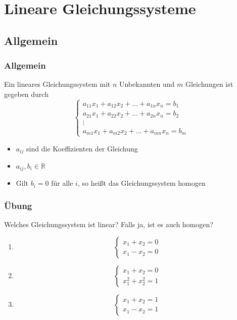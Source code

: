 \section{Lineare Gleichungssysteme}

\subsection{Allgemein}
\begin{frame}
    \frametitle{Allgemein}
    Ein lineares Gleichungssystem mit $n$ Unbekannten und $m$ Gleichungen ist gegeben durch
    \begin{equation*}
        \begin{cases}
            a_{11}x_1 + a_{12}x_2 + \dots + a_{1n}x_n = b_1 \\
            a_{21}x_1 + a_{22}x_2 + \dots + a_{2n}x_n = b_2 \\
            \vdots \\
            a_{m1}x_1 + a_{m2}x_2 + \dots + a_{mn}x_n = b_m
        \end{cases}
    \end{equation*}
    \begin{itemize}
        \item $a_{ij}$ sind die Koeffizienten der Gleichung
        \item $a_{ij},  b_i \in \mathbb{R}$
        \item Gilt $b_i = 0$ für alle $i$, so heißt das Gleichungssystem homogen
    \end{itemize}
\end{frame}

\begin{frame}
    \frametitle{Übung}
    Welches Gleichungssystem ist linear?
    Falls ja, ist es auch homogen?
    \begin{enumerate}
        \item
        \begin{equation*}
            \begin{cases}
                x_1 + x_2 = 0 \\
                x_1 - x_2 = 0
            \end{cases}
        \end{equation*}
        \item
        \begin{equation*}
            \begin{cases}
                x_1 + x_2 = 0 \\
                x_1^2 + x_2^2 = 1
            \end{cases}
        \end{equation*}
        \item
        \begin{equation*}
            \begin{cases}
                x_1 + x_2 = 1 \\
                x_1 - x_2 = 1
            \end{cases}
        \end{equation*}
    \end{enumerate}
\end{frame}

